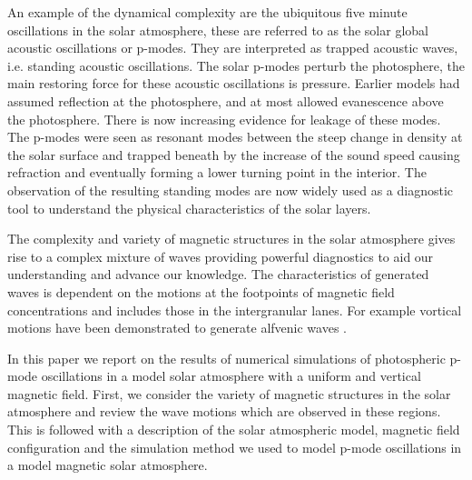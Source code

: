 \documentclass{aastex62}
\begin{document}

An example of the dynamical complexity are the ubiquitous five minute oscillations in the solar atmosphere, these are referred to as the solar global acoustic oscillations or p-modes. They are interpreted as trapped acoustic waves, i.e. standing acoustic oscillations. The solar p-modes perturb the photosphere, the main restoring force for these acoustic oscillations is pressure.  Earlier models had assumed reflection at the photosphere, and at most allowed evanescence above the photosphere. There is now increasing evidence for leakage of these modes. The p-modes were seen as resonant modes between the steep change in density at the solar surface and trapped beneath by the increase of the sound speed causing refraction and eventually forming a lower turning point in the interior. The observation of the resulting standing modes are now widely used as a diagnostic tool to understand the physical characteristics of the solar layers.

The complexity and variety of magnetic structures in the solar atmosphere gives rise to a complex mixture of waves providing powerful diagnostics to aid our understanding and advance our knowledge. The characteristics of generated waves is dependent on the motions at the footpoints of magnetic field concentrations and includes those in the intergranular lanes. For example vortical motions have been demonstrated to generate alfvenic waves \citet{Fedun2011}. 

In this paper we report on the results of numerical simulations of photospheric p-mode oscillations in a model solar atmosphere with a uniform and vertical magnetic field. First, we consider the variety of magnetic structures in the solar atmosphere and review the wave motions which are observed in these regions. This is followed with a description of the solar atmospheric model, magnetic field configuration and the simulation method we used to model p-mode oscillations in a model magnetic solar atmosphere.
\end{document}
